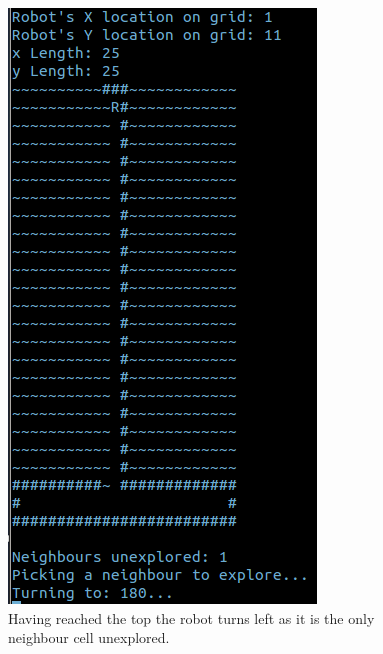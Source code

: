 \documentclass[a4paper,12pt]{article}
\begin{document}
\begin{figure}[H]
\includegraphics[scale=1.0]{RunT3.png}
\caption{Having reached the top the robot turns left as it is the only neighbour cell unexplored.}
\end{figure}
\end{document}

